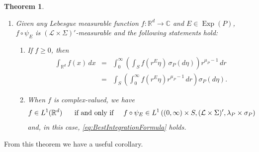 \documentclass[11pt, letter]{book}
\newtheorem{theorem}{Theorem}[section]
\newcommand\Exp{\operatorname{Exp}}
\begin{document}
\begin{framed}
\begin{theorem}
\begin{enumerate}
\begin{equation*}
\end{equation*}
and, for each $A\in\mathcal{M}_d$,
\begin{equation*}
m(A)=(\lambda_P\times\sigma_P)(\psi_E^{-1}(A)).
\end{equation*}
\item\label{property:BestIntegrationFormula} Given any Lebesgue measurable function $f:\mathbb{R}^d\to\mathbb{C}$ and $E\in \Exp(P)$, $f\circ \psi_E$ is $(\mathcal{L}\times\Sigma)'$-measurable and the following statements hold:
\begin{enumerate}
\item If $f\geq 0$, then
\begin{eqnarray}\label{eq:BestIntegrationFormula}
\int_{\mathbb{R}^d}f(x)\,dx
&=&\int_0^\infty\left(\int_S f(r^E\eta)\,\sigma_P(d\eta)\right)r^{\mu_P-1}\,dr\nonumber \\
&=&\int_S\left(\int_0^\infty f(r^E\eta)r^{\mu_P-1}\,dr\right)\sigma_P(d\eta).
\end{eqnarray}
\item When $f$ is complex-valued, we have 
\begin{equation*}f\in L^1(\mathbb{R}^d)\hspace{.5cm}\mbox{ if and only if}\hspace{.5cm}f\circ\psi_E\in L^1\left((0,\infty)\times S,(\mathcal{L}\times\Sigma)',\lambda_P\times\sigma_P\right)
\end{equation*} 
and, in this case, \eqref{eq:BestIntegrationFormula} holds.
\end{enumerate}
\end{enumerate}
\end{theorem}
\end{framed}

\noindent From this theorem we have a useful corollary.
\end{document}
